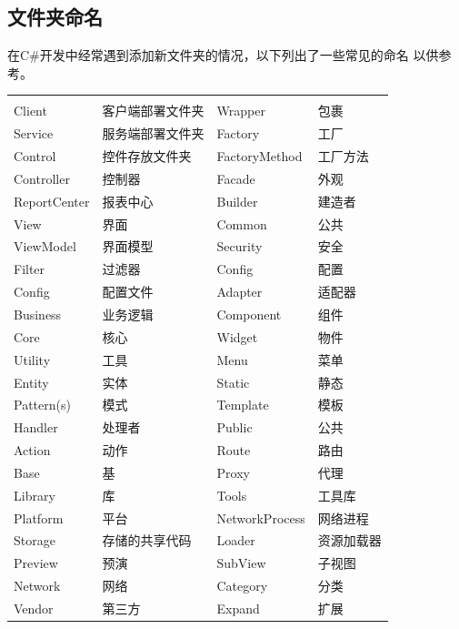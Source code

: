 \documentclass{book}
\begin{document}
\subsection{文件夹命名}

在C\#开发中经常遇到添加新文件夹的情况，以下列出了一些常见的命名
以供参考。

\begin{tabular}{ll|ll}
	\multirow{1}{*}{}			
	& \multicolumn{1}{c}{}
	& \multicolumn{1}{c}{}
	& \multicolumn{1}{c}{}\\
	Client & 客户端部署文件夹 & Wrapper & 包裹\\
	Service & 服务端部署文件夹 & Factory & 工厂\\	
	Control & 控件存放文件夹 & FactoryMethod & 工厂方法\\
	Controller & 控制器 & Facade & 外观\\
	ReportCenter & 报表中心 & Builder & 建造者\\
	View & 界面 & Common & 公共\\
	ViewModel & 界面模型 & Security & 安全\\
	Filter & 过滤器 & Config & 配置\\
	Config & 配置文件 & Adapter & 适配器\\
	Business & 业务逻辑 & Component & 组件 \\
	Core & 核心 & Widget & 物件\\
	Utility & 工具 & Menu & 菜单\\
	Entity & 实体 & Static & 静态\\
	Pattern(s) & 模式 & Template & 模板\\
	Handler & 处理者 & Public\footnotemark[1] & 公共\\
	Action & 动作 & Route & 路由\\
	Base & 基 & Proxy & 代理\\ 
	Library & 库 & Tools & 工具库 \\
    Platform & 平台 & NetworkProcess & 网络进程 \\
    Storage & 存储的共享代码 & Loader & 资源加载器\\
    Preview\footnotemark[2] & 预演 & SubView & 子视图\\
    Network & 网络 & Category & 分类\\
    Vendor\footnotemark[3] & 第三方 & Expand & 扩展\\
\end{tabular}

\end{document}
